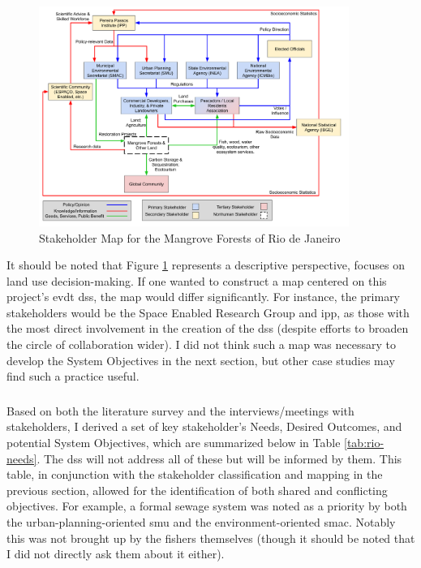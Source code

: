 \begin{figure}[!htb]
	\centering
	\includegraphics[width=0.9\textwidth]{Figures/chap4/Stakeholder_Map.png}
	\caption[Stakeholder Map for the Mangrove Forests of Rio de Janeiro]{Stakeholder Map for the Mangrove Forests of Rio de Janeiro}
	\label{fig:rio_stakemap}
\end{figure}

It should be noted that Figure \ref{fig:rio_stakemap} represents a descriptive perspective, focuses on land use decision-making. If one wanted to construct a map centered on this project's \ac{evdt} \ac{dss}, the map would differ significantly. For instance, the primary stakeholders would be the Space Enabled Research Group and \ac{ipp}, as those with the most direct involvement in the creation of the \ac{dss} (despite efforts to broaden the circle of collaboration wider). I did not think such a map was necessary to develop the System Objectives in the next section, but other case studies may find such a practice useful.

\subsubsection{} \label{sec:rio-saf-objectives-result}

Based on both the literature survey and the interviews/meetings with stakeholders, I derived a set of key stakeholder's Needs, Desired Outcomes, and potential System Objectives, which are summarized below in Table \ref{tab:rio-needs}. The \ac{dss} will not address all of these but will be informed by them. This table, in conjunction with the stakeholder classification and mapping in the previous section, allowed for the identification of both shared and conflicting objectives. For example, a formal sewage system was noted as a priority by both the urban-planning-oriented \ac{smu} and the environment-oriented \ac{smac}. Notably this was not brought up by the fishers themselves (though it should be noted that I did not directly ask them about it either). 

